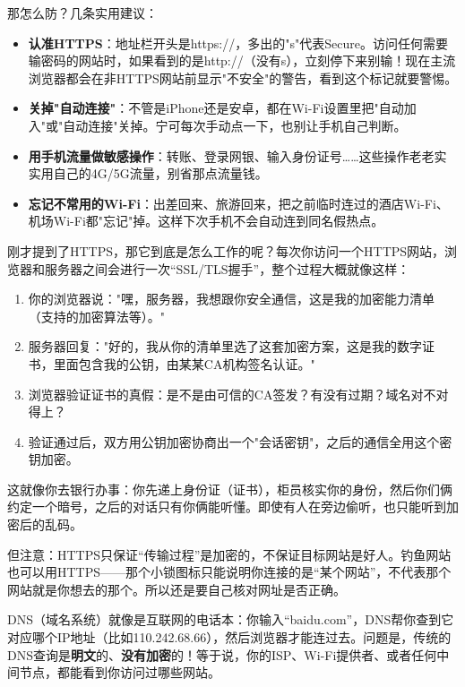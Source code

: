 那怎么防？几条实用建议：

\begin{itemize}
  \item \textbf{认准HTTPS}：地址栏开头是https://，多出的"s"代表Secure。访问任何需要输密码的网站时，如果看到的是http://（没有s），立刻停下来别输！现在主流浏览器都会在非HTTPS网站前显示"不安全"的警告，看到这个标记就要警惕。
  \item \textbf{关掉"自动连接"}：不管是iPhone还是安卓，都在Wi-Fi设置里把"自动加入"或"自动连接"关掉。宁可每次手动点一下，也别让手机自己判断。
  \item \textbf{用手机流量做敏感操作}：转账、登录网银、输入身份证号……这些操作老老实实用自己的4G/5G流量，别省那点流量钱。
  \item \textbf{忘记不常用的Wi-Fi}：出差回来、旅游回来，把之前临时连过的酒店Wi-Fi、机场Wi-Fi都"忘记"掉。这样下次手机不会自动连到同名假热点。
\end{itemize}


刚才提到了HTTPS，那它到底是怎么工作的呢？每次你访问一个HTTPS网站，浏览器和服务器之间会进行一次“SSL/TLS握手”，整个过程大概就像这样：

\begin{enumerate}
  \item 你的浏览器说："嘿，服务器，我想跟你安全通信，这是我的加密能力清单（支持的加密算法等）。"
  \item 服务器回复："好的，我从你的清单里选了这套加密方案，这是我的数字证书，里面包含我的公钥，由某某CA机构签名认证。"
  \item 浏览器验证证书的真假：是不是由可信的CA签发？有没有过期？域名对不对得上？
  \item 验证通过后，双方用公钥加密协商出一个"会话密钥"，之后的通信全用这个密钥加密。
\end{enumerate}

这就像你去银行办事：你先递上身份证（证书），柜员核实你的身份，然后你们俩约定一个暗号，之后的对话只有你俩能听懂。即使有人在旁边偷听，也只能听到加密后的乱码。

但注意：HTTPS只保证“传输过程”是加密的，不保证目标网站是好人。钓鱼网站也可以用HTTPS——那个小锁图标只能说明你连接的是“某个网站”，不代表那个网站就是你想去的那个。所以还是要自己核对网址是否正确。


DNS（域名系统）就像是互联网的电话本：你输入“baidu.com”，DNS帮你查到它对应哪个IP地址（比如110.242.68.66），然后浏览器才能连过去。问题是，传统的DNS查询是\textbf{明文}的、\textbf{没有加密}的！等于说，你的ISP、Wi-Fi提供者、或者任何中间节点，都能看到你访问过哪些网站。

